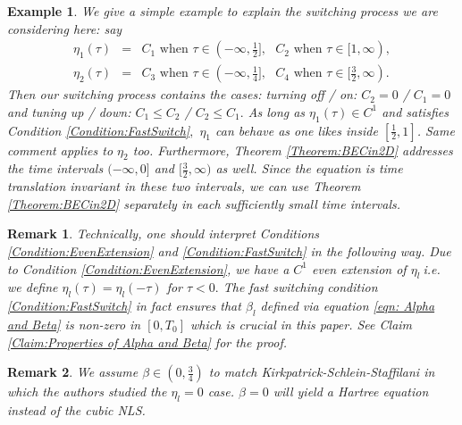 \documentclass[reqno]{amsart}
\theoremstyle{plain}
\newtheorem{example}{Example}
\newtheorem{remark}{Remark}
\numberwithin{equation}{section}
\begin{document}
\begin{example}
We give a simple example to explain the switching process we are considering
here: say 
\begin{eqnarray*}
\eta _{1}(\tau ) &=&C_{1}\text{ when }\tau \in (-\infty ,\frac{1}{2}],\text{ 
}C_{2}\text{ when }\tau \in \lbrack 1,\infty ), \\
\eta _{2}(\tau ) &=&C_{3}\text{ when }\tau \in (-\infty ,\frac{1}{4}],\text{ 
}C_{4}\text{ when }\tau \in \lbrack \frac{3}{2},\infty ).
\end{eqnarray*}Then our switching process contains the cases: turning off / on: $C_{2}=0$ / 
$C_{1}=0$ and tuning up / down: $C_{1}\leqslant C_{2}$ / $C_{2}\leqslant
C_{1}.$ As long as $\eta _{1}(\tau )\in C^{1}$ and satisfies Condition \ref{Condition:FastSwitch}$,$ $\eta _{1}$ can behave as one likes inside $[\frac{1}{2},1]$. Same comment applies to $\eta _{2}$ too. Furthermore, Theorem \ref{Theorem:BECin2D} addresses the time intervals $(-\infty ,0]$ and $[\frac{3}{2},\infty )$ as well. Since the equation is time translation invariant in
these two intervals, we can use Theorem \ref{Theorem:BECin2D} separately in
each sufficiently small time intervals.
\end{example}

\begin{remark}
Technically, one should interpret Conditions \ref{Condition:EvenExtension}
and \ref{Condition:FastSwitch} in the following way. Due to Condition \ref{Condition:EvenExtension}, we have a $C^{1}$ even extension of $\eta _{l}\ $i.e. we define $\eta _{l}(\tau )=\eta _{l}(-\tau )$ for $\tau <0.$ The fast
switching condition \ref{Condition:FastSwitch} in fact ensures that $\beta
_{l}$ defined via equation \ref{eqn: Alpha and Beta} is non-zero in $[0,T_{0}]$ which is crucial in this paper. See Claim \ref{Claim:Properties
of Alpha and Beta} for the proof.
\end{remark}

\begin{remark}
We assume $\beta \in \left( 0,\frac{3}{4}\right) $ to match
Kirkpatrick-Schlein-Staffilani \cite{Kirpatrick} in which the authors
studied the $\eta _{l}=0$ case. $\beta =0$ will yield a Hartree equation
instead of the cubic NLS.
\end{remark}
\end{document}
